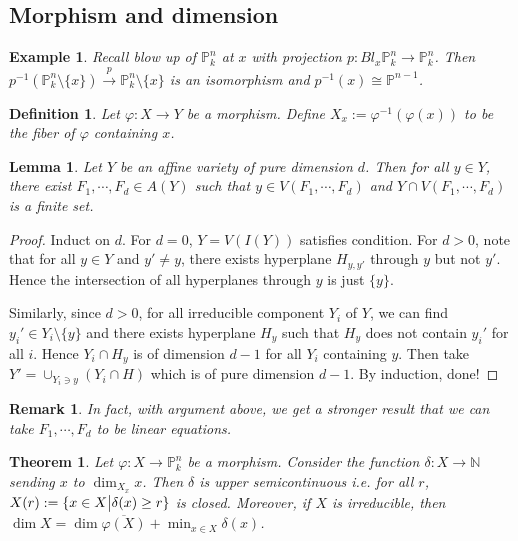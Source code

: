 \documentclass{ctexart}
\newtheorem{definition}{Definition}[section]
\newtheorem{remark}{Remark}[section]
\newtheorem{theorem}{Theorem}[section]
\newtheorem{lemma}{Lemma}[section]
\newtheorem{example}{Example}[section]
\begin{document}
\subsection{Morphism and dimension}
\label{subsection:Dimension_Theory_Morphism_and_dimension}

\begin{example}
    Recall blow up of $\mathbb{P}_{k}^{n}$ at $x$ with projection $p: Bl_{x}\mathbb{P}_{k}^{n} \rightarrow \mathbb{P}_{k}^{n}$.
    Then $p^{-1}(\mathbb{P}_{k}^{n} \setminus \{x\}) \overset{p}{\rightarrow} \mathbb{P}_{k}^{n} \setminus \{x\}$ is an isomorphism and $p^{-1}(x) \cong \mathbb{P}^{n - 1}$.
\end{example}
\begin{definition}
    Let $\varphi: X \rightarrow Y$ be a morphism.
    Define $X_{x} := \varphi^{-1}(\varphi(x))$ to be the fiber of $\varphi$ containing $x$.
\end{definition}
\begin{lemma}
    Let $Y$ be an affine variety of pure dimension $d$.
    Then for all $y\in Y$, there exist $F_{1}, \cdots, F_{d}\in A(Y)$ such that $y\in V(F_{1}, \cdots, F_{d})$ and $Y \cap V(F_{1}, \cdots, F_{d})$ is a finite set.
    \label{Lemma 4.2}
\end{lemma}
\begin{proof}
    Induct on $d$.
    For $d = 0$, $Y = V(I(Y))$ satisfies condition.
    For $d > 0$, note that for all $y\in Y$ and $y' \neq y$, there exists hyperplane $H_{y, y'}$ through $y$ but not $y'$.
    Hence the intersection of all hyperplanes through $y$ is just $\{y\}$.
    \par
    Similarly, since $d > 0$, for all irreducible component $Y_{i}$ of $Y$,
    we can find $y_{i}'\in Y_{i} \setminus \{y\}$ and there exists hyperplane $H_{y}$ such that $H_{y}$ does not contain $y_{i}'$ for all $i$.
    Hence $Y_{i} \cap H_{y}$ is of dimension $d - 1$ for all $Y_{i}$ containing $y$.
    Then take $Y' = \cup_{Y_{i}\ni y} (Y_{i} \cap H)$ which is of pure dimension $d - 1$.
    By induction, done!
\end{proof}
\begin{remark}
    In fact, with argument above, we get a stronger result that we can take $F_{1}, \cdots, F_{d}$ to be linear equations.
\end{remark}
\begin{theorem}
    Let $\varphi: X \rightarrow \mathbb{P}_{k}^{n}$ be a morphism.
    Consider the function $\delta: X \rightarrow \mathbb{N}$ sending $x$ to $\dim_{X_{x}} x$.
    Then $\delta$ is upper semicontinuous i.e. for all $r$, $X(r) := \{x\in X \big{|} \delta(x) \ge r\}$ is closed.
    Moreover, if $X$ is irreducible, then $\dim X = \dim \overline{\varphi(X)} + \min_{x\in X} \delta(x)$.
    \label{Theorem 4.6}
\end{theorem}
\end{document}
